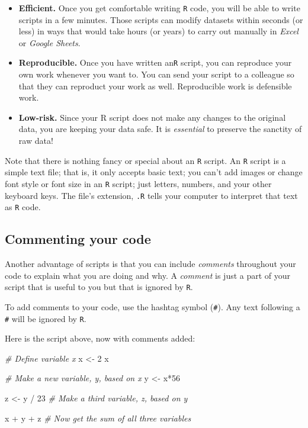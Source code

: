 \documentclass[
]{book}
\newenvironment{Shaded}{\begin{snugshade}}{\end{snugshade}}
\newcommand{\CommentTok}[1]{\textcolor[rgb]{0.56,0.35,0.01}{\textit{#1}}}
\newcommand{\DecValTok}[1]{\textcolor[rgb]{0.00,0.00,0.81}{#1}}
\newcommand{\NormalTok}[1]{#1}
\newcommand{\OtherTok}[1]{\textcolor[rgb]{0.56,0.35,0.01}{#1}}
\newcommand{\SpecialCharTok}[1]{\textcolor[rgb]{0.00,0.00,0.00}{#1}}
\begin{document}
\begin{itemize}
\item
  \textbf{Efficient.} Once you get comfortable writing \texttt{R} code, you will be able to write scripts in a few minutes. Those scripts can modify datasets within seconds (or less) in ways that would take hours (or years) to carry out manually in \emph{Excel} or \emph{Google Sheets}.
\item
  \textbf{Reproducible.} Once you have written an\texttt{R} script, you can reproduce your own work whenever you want to. You can send your script to a colleague so that they can reproduct your work as well. Reproducible work is defensible work.
\item
  \textbf{Low-risk.} Since your R script does not make any changes to the original data, you are keeping your data safe. It is \emph{essential} to preserve the sanctity of raw data!
\end{itemize}

Note that there is nothing fancy or special about an \texttt{R} script. An \texttt{R} script is a simple text file; that is, it only accepts basic text; you can't add images or change font style or font size in an \texttt{R} script; just letters, numbers, and your other keyboard keys. The file's extension, \texttt{.R} tells your computer to interpret that text as \texttt{R} code.

\hypertarget{commenting-your-code}{%
\subsection*{Commenting your code}\label{commenting-your-code}}

Another advantage of scripts is that you can include \emph{comments} throughout your code to explain what you are doing and why. A \emph{comment} is just a part of your script that is useful to you but that is ignored by \texttt{R}.

To add comments to your code, use the hashtag symbol (\texttt{\#}). Any text following a \texttt{\#} will be ignored by \texttt{R}.

Here is the script above, now with comments added:

\begin{Shaded}
\begin{Highlighting}[]
\CommentTok{\# Define variable x}
\NormalTok{x }\OtherTok{\textless{}{-}} \DecValTok{2} 
\NormalTok{x}

\CommentTok{\# Make a new variable, y, based on x}
\NormalTok{y }\OtherTok{\textless{}{-}}\NormalTok{ x}\SpecialCharTok{*}\DecValTok{56}

\NormalTok{z }\OtherTok{\textless{}{-}}\NormalTok{ y }\SpecialCharTok{/} \DecValTok{23} \CommentTok{\# Make a third variable, z, based on y}
 
\NormalTok{x }\SpecialCharTok{+}\NormalTok{ y }\SpecialCharTok{+}\NormalTok{ z }\CommentTok{\# Now get the sum of all three variables}
\end{Highlighting}
\end{Shaded}
\end{document}
